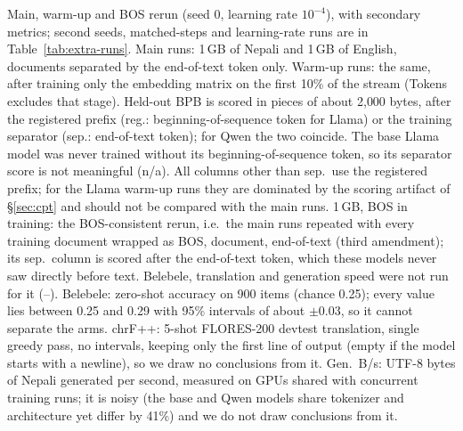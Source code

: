 \begin{table}[t]
\caption{Main, warm-up and BOS rerun (seed 0, learning rate $10^{-4}$), with secondary metrics; second seeds, matched-steps and learning-rate runs are in Table~\ref{tab:extra-runs}. Main runs: 1\,GB of Nepali and 1\,GB of English, documents separated by the end-of-text token only. Warm-up runs: the same, after training only the embedding matrix on the first 10\% of the stream (Tokens excludes that stage). Held-out BPB is scored in pieces of about 2{,}000 bytes, after the registered prefix (reg.: beginning-of-sequence token for Llama) or the training separator (sep.: end-of-text token); for Qwen the two coincide. The base Llama model was never trained without its beginning-of-sequence token, so its separator score is not meaningful (n/a). All columns other than sep.\ use the registered prefix; for the Llama warm-up runs they are dominated by the scoring artifact of \S\ref{sec:cpt} and should not be compared with the main runs. 1\,GB, BOS in training: the BOS-consistent rerun, i.e.\ the main runs repeated with every training document wrapped as BOS, document, end-of-text (third amendment); its sep.\ column is scored after the end-of-text token, which these models never saw directly before text. Belebele, translation and generation speed were not run for it (--). Belebele: zero-shot accuracy on 900 items (chance 0.25); every value lies between 0.25 and 0.29 with 95\% intervals of about $\pm$0.03, so it cannot separate the arms. chrF++: 5-shot FLORES-200 devtest translation, single greedy pass, no intervals, keeping only the first line of output (empty if the model starts with a newline), so we draw no conclusions from it. Gen.\ B/s: UTF-8 bytes of Nepali generated per second, measured on GPUs shared with concurrent training runs; it is noisy (the base and \RO{} Qwen models share tokenizer and architecture yet differ by 41\%) and we do not draw conclusions from it.}
\label{tab:cpt}
\end{table}
